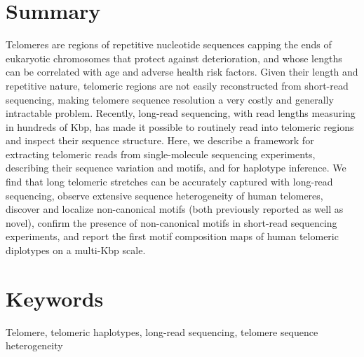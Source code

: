 \documentclass{article}
\begin{document}
\section*{Summary} 
Telomeres are regions of repetitive nucleotide sequences capping the ends of eukaryotic chromosomes that protect against deterioration, and whose lengths can be correlated with age and adverse health risk factors.
Given their length and repetitive nature, telomeric regions are not easily reconstructed from short-read sequencing, making telomere sequence resolution a very costly and generally intractable problem.
Recently, long-read sequencing, with read lengths measuring in hundreds of Kbp, has made it possible to routinely read into telomeric regions and inspect their sequence structure.
Here, we describe a framework for extracting telomeric reads from single-molecule sequencing experiments, describing their sequence variation and motifs, and for haplotype inference.
We find that
long telomeric stretches can be accurately captured with long-read sequencing,
observe extensive sequence heterogeneity of human telomeres,
discover and localize non-canonical motifs (both previously reported as well as novel),
confirm the presence of non-canonical motifs in short-read sequencing experiments,
and report the first motif composition maps of human telomeric diplotypes on a multi-Kbp scale.

\section*{Keywords} 
Telomere, telomeric haplotypes, long-read sequencing, telomere sequence heterogeneity

\pagebreak
\doublespacing
\end{document}
